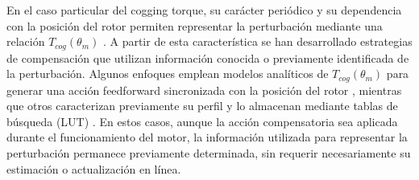 En el caso particular del cogging torque, su carácter periódico y su dependencia con la posición del rotor permiten representar la perturbación mediante una relación \(T_{cog}(\theta_m)\) \cite{guzinskiSensorlessLowSpeed2019,ariasReducingCoggingTorque2019}. A partir de esta característica se han desarrollado estrategias de compensación que utilizan información conocida o previamente identificada de la perturbación. Algunos enfoques emplean modelos analíticos de \(T_{cog}(\theta_m)\) para generar una acción feedforward sincronizada con la posición del rotor \cite{picatosteruilopeModellingControlStepper2014,zhangSmoothSensorlessStartup2026}, mientras que otros caracterizan previamente su perfil y lo almacenan mediante tablas de búsqueda (LUT) \cite{guzinskiSensorlessLowSpeed2019,wuDesignImplementationPositionBased2019,piccoliCoggingTorqueRipple2014a,petroHFPulseSignal2025}. En estos casos, aunque la acción compensatoria sea aplicada durante el funcionamiento del motor, la información utilizada para representar la perturbación permanece previamente determinada, sin requerir necesariamente su estimación o actualización en línea.

